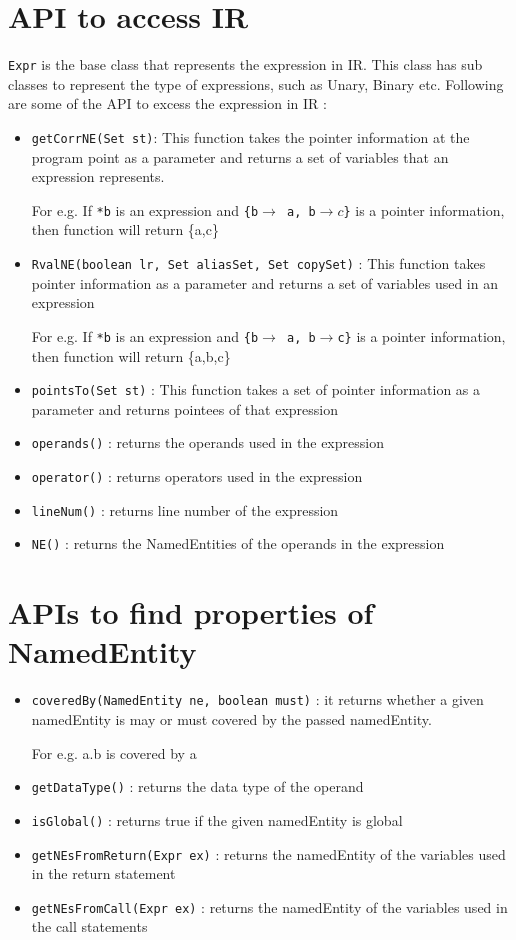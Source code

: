 \documentclass[11pt,a4paper,openright]{report}
\begin{document}
\section{API to access IR}
\texttt{Expr} is the base class that represents the expression in IR. This class has sub classes to represent the type of expressions, such as Unary, Binary etc.
Following are some of the API to excess the expression in IR :
\begin{itemize}
 \item \texttt{getCorrNE(Set st)}: This function takes the pointer information at the program point as a parameter and returns a set of variables that an expression represents.
 
 For e.g. If \texttt{*b} is an expression and \texttt{\{b$\rightarrow$ a, b$\rightarrow c$\}} is a pointer information, then function will return \{a,c\}
 
 \item \texttt{RvalNE(boolean lr, Set aliasSet, Set copySet)} : This function takes pointer information as a parameter and returns a set of variables used in an expression
 
 For e.g. If \texttt{*b} is an expression and \texttt{\{b$\rightarrow$ a, b$\rightarrow$c\}} is a pointer information, then function will return \{a,b,c\}
 
 \item \texttt{pointsTo(Set st)} : This function takes a set of pointer information as a parameter and returns pointees of that expression
 \item \texttt{operands()} : returns the operands used in the expression
 \item \texttt{operator()} : returns operators used in the expression
 \item \texttt{lineNum()} : returns line number of the expression
 \item \texttt{NE()} : returns the NamedEntities of the operands in the expression
\end{itemize}

\section{APIs to find properties of NamedEntity}
\begin{itemize}
 \item \texttt{coveredBy(NamedEntity ne, boolean must)} : it returns whether a given namedEntity is may or must covered by the passed namedEntity.
 
 For e.g. a.b is covered by a
 \item \texttt{getDataType()} : returns the data type of the operand

 \item \texttt{isGlobal()} : returns true if the given namedEntity is global
 \item \texttt{getNEsFromReturn(Expr ex)} : returns the namedEntity of the variables used in the return statement
 \item \texttt{getNEsFromCall(Expr ex)} : returns the namedEntity of the variables used in the call statements
\end{itemize}
\end{document}
